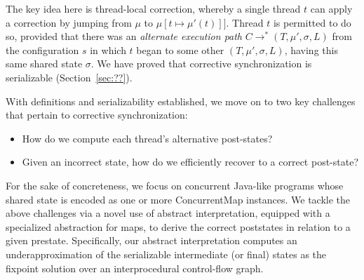 The key idea here is thread-local correction, whereby a single
thread $t$ can apply a correction by jumping from $\mu$ to
$\mu[t \mapsto \mu'(t)]]$. Thread $t$ is permitted to do so,
  provided that there was an \emph{alternate execution path}
  $C \rightarrow^{*} (T,\mu',\sigma,L)$ from the configuration $s$
  in which $t$ began to some other $(T,\mu',\sigma,L)$, having this
  same shared state $\sigma$.
%
%
%
We have proved that corrective synchronization is serializable (Section~\ref{sec:??}).

%
With definitions and serializability established, we move on to two key challenges
that pertain to corrective synchronization:
\begin{itemize}
\item How do we compute each thread's alternative post-states?
\item Given an incorrect state, how do we efficiently recover to a correct post-state?
\end{itemize}
%
For the sake of concreteness, we focus on concurrent Java-like
programs whose shared state is encoded as one or more {\sf
  ConcurrentMap} instances.  We tackle the above challenges via a
novel use of abstract interpretation, equipped with a specialized
abstraction for maps, to derive the correct poststates in relation to
a given prestate.
%
Specifically, our abstract interpretation computes an
underapproximation of the serializable intermediate (or final) states
as the fixpoint solution over an interprocedural control-flow graph.
  
%

